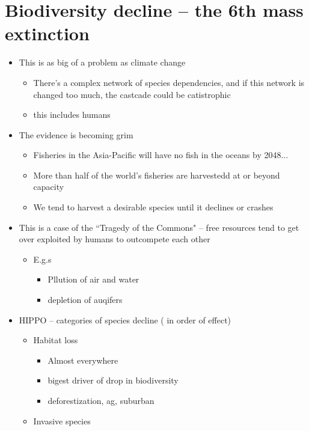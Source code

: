 \documentclass{article}
\theoremstyle{definition}
\begin{document}
\section{Biodiversity decline -- the 6th mass extinction}
\begin{itemize}
	\item This is as big of a problem as climate change
		\begin{itemize}
			\item There's a complex network of species dependencies, and if this network is changed too much, the castcade could be catistrophic
			\item this includes humans
		\end{itemize}
	\item The evidence is becoming grim 
		\begin{itemize}
			\item Fisheries in the Asia-Pacific will have no fish in the oceans by 2048...
			\item More than half of the world's fisheries are harvestedd at or beyond capacity
			\item We tend to harvest a desirable species until it declines or crashes
		\end{itemize}
	\item This is a case of the ``Tragedy of the Commons" -- free resources tend to get over exploited by humans to outcompete each other
		\begin{itemize}
			\item E.g.s
				\begin{itemize}
					\item Pllution of air and water
					\item depletion of auqifers
				\end{itemize}
		\end{itemize}
	\item HIPPO -- categories of species decline ( in order of effect)
		\begin{itemize}
			\item Habitat loss
				\begin{itemize}
					\item Almost everywhere
					\item bigest driver of drop in biodiversity
					\item deforestization, ag, suburban
				\end{itemize}
			\item Invasive species
				\begin{itemize}

\end{itemize}
\end{itemize}
\end{itemize}
\end{document}
